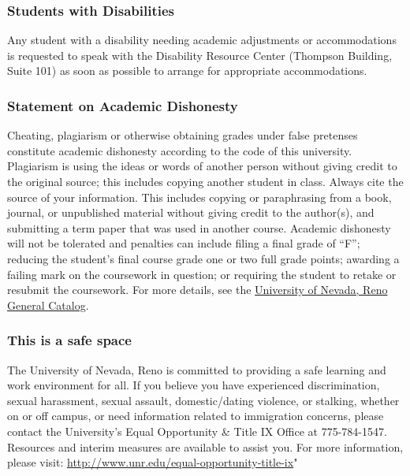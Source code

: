 \documentclass[]{article}
\begin{document}
\subsubsection{Students with
Disabilities}\label{students-with-disabilities}

Any student with a disability needing academic adjustments or
accommodations is requested to speak with the Disability Resource Center
(Thompson Building, Suite 101) as soon as possible to arrange for
appropriate accommodations.

\subsubsection{Statement on Academic
Dishonesty}\label{statement-on-academic-dishonesty}

Cheating, plagiarism or otherwise obtaining grades under false pretenses
constitute academic dishonesty according to the code of this university.
Plagiarism is using the ideas or words of another person without giving
credit to the original source; this includes copying another student in
class. Always cite the source of your information. This includes copying
or paraphrasing from a book, journal, or unpublished material without
giving credit to the author(s), and submitting a term paper that was
used in another course. Academic dishonesty will not be tolerated and
penalties can include filing a final grade of ``F''; reducing the
student's final course grade one or two full grade points; awarding a
failing mark on the coursework in question; or requiring the student to
retake or resubmit the coursework. For more details, see the
\href{http://catalog.unr.edu/}{University of Nevada, Reno General
Catalog}.

\subsubsection{This is a safe space}\label{this-is-a-safe-space}

The University of Nevada, Reno is committed to providing a safe learning
and work environment for all. If you believe you have experienced
discrimination, sexual harassment, sexual assault, domestic/dating
violence, or stalking, whether on or off campus, or need information
related to immigration concerns, please contact the University's Equal
Opportunity \& Title IX Office at 775-784-1547. Resources and interim
measures are available to assist you. For more information, please
visit: \url{http://www.unr.edu/equal-opportunity-title-ix}"
\end{document}
